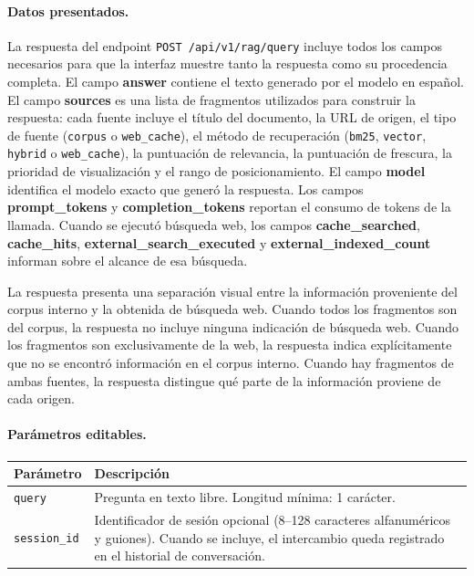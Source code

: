 \documentclass[11pt]{article}
\begin{document}
\paragraph{Datos presentados.}
La respuesta del endpoint \texttt{POST /api/v1/rag/query} incluye todos los campos necesarios
para que la interfaz muestre tanto la respuesta como su procedencia completa. El campo
\textbf{answer} contiene el texto generado por el modelo en español. El campo \textbf{sources}
es una lista de fragmentos utilizados para construir la respuesta: cada fuente incluye el
título del documento, la URL de origen, el tipo de fuente (\texttt{corpus} o
\texttt{web\_cache}), el método de recuperación (\texttt{bm25}, \texttt{vector},
\texttt{hybrid} o \texttt{web\_cache}), la puntuación de relevancia, la puntuación de frescura,
la prioridad de visualización y el rango de posicionamiento. El campo \textbf{model} identifica
el modelo exacto que generó la respuesta. Los campos \textbf{prompt\_tokens} y
\textbf{completion\_tokens} reportan el consumo de tokens de la llamada. Cuando se ejecutó
búsqueda web, los campos \textbf{cache\_searched}, \textbf{cache\_hits},
\textbf{external\_search\_executed} y \textbf{external\_indexed\_count} informan sobre el
alcance de esa búsqueda.

La respuesta presenta una separación visual entre la información proveniente del corpus interno
y la obtenida de búsqueda web. Cuando todos los fragmentos son del corpus, la respuesta no
incluye ninguna indicación de búsqueda web. Cuando los fragmentos son exclusivamente de la web,
la respuesta indica explícitamente que no se encontró información en el corpus interno. Cuando
hay fragmentos de ambas fuentes, la respuesta distingue qué parte de la información proviene
de cada origen.

\paragraph{Parámetros editables.}

\begin{center}
\begin{tabular}{lp{9cm}}
\toprule
\textbf{Parámetro} & \textbf{Descripción} \\
\midrule
\texttt{query}      & Pregunta en texto libre. Longitud mínima: 1 carácter. \\
\texttt{session\_id} & Identificador de sesión opcional (8--128 caracteres alfanuméricos
                       y guiones). Cuando se incluye, el intercambio queda registrado en
                       el historial de conversación. \\
\bottomrule
\end{tabular}
\end{center}
\end{document}

